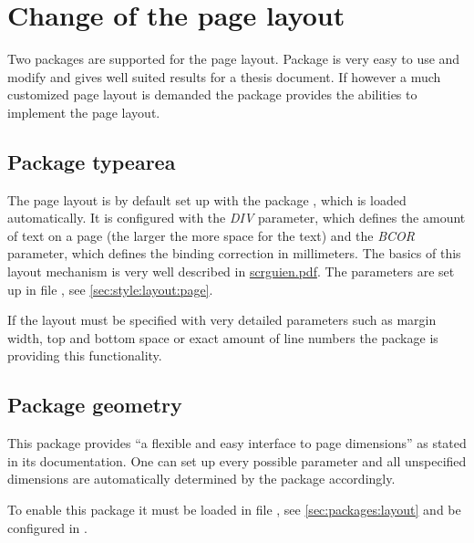 \section{Change of the page layout}
\label{sec:doc:faq:pagelayout}

Two packages are supported for the page layout. Package  is very easy to use and modify and gives well suited results for a thesis document. If however a much customized page layout is demanded the package  provides the abilities to implement the page layout.

\subsection{Package typearea}
The page layout is by default set up with the package , which is loaded automatically. It is configured with the \emph{DIV} parameter, which defines the amount of text on a page (the larger the more space for the text) and the \emph{BCOR} parameter, which defines the binding correction in millimeters. The basics of this layout mechanism is very well described in \href{http://mirrors.ctan.org/macros/latex/contrib/koma-script/doc/scrguien.pdf}{scrguien.pdf}. The parameters are set up in file , see \cref{sec:style:layout:page}.

If the layout must be specified with very detailed parameters such as margin width, top and bottom space or exact amount of line numbers the package  is providing this functionality.

\subsection{Package geometry}
This package provides \enquote{a flexible and easy interface to page dimensions} as stated in its documentation. One can set up every possible parameter and all unspecified dimensions are automatically determined by the package accordingly.

To enable this package it must be loaded in file , see \cref{sec:packages:layout} and be configured in .

